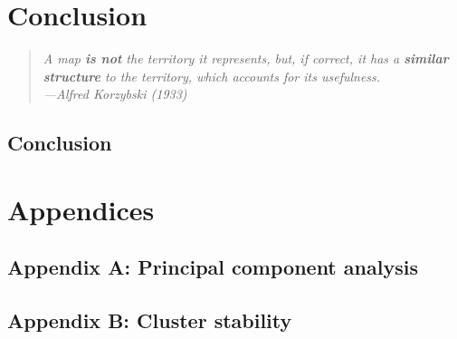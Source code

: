 \documentclass[12pt, TexShade, letterpaper]{report}
\begin{document}
%
%

\part{Conclusion}
\label{part:conclusion}

\pagebreak
\hspace{0pt}
\vfill

\begin{center}
\begin{quote} 
\begin{singlespace}
\textit{A map \textbf{is not} the territory it represents, but, if correct, it has a \textbf{similar structure} to the territory, which accounts for its usefulness.\\
---Alfred Korzybski (1933)}
\end{singlespace}
\end{quote}
\end{center}

\vfill
\hspace{0pt}
\pagebreak

\chapter*{Conclusion}
\label{chap:conclusion}



%

\newpage

%
%



%
%
%


%


%
%

\appendix

\part{Appendices}
\chapter*{Appendix A: Principal component analysis}
\label{appendix:AppendixA}


\chapter*{Appendix B: Cluster stability}
\label{appendix:AppendixB}

\end{document}
